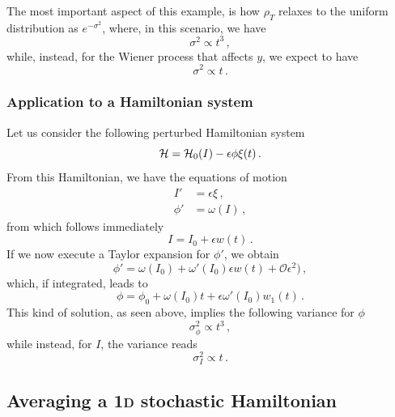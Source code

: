 The most important aspect of this example, is how \(\rho_T\) relaxes to the uniform distribution as \(e^{-\sigma^2}\), where, in this scenario, we have
\begin{equation}
	\sigma^2 \propto t^{3} \,,
\end{equation}
while, instead, for the Wiener process that affects \(y\), we expect to have
\begin{equation}
	\sigma^2 \propto t \,.
\end{equation}

\subsubsection*{Application to a Hamiltonian system}

Let us consider the following perturbed Hamiltonian system
\begin{equation}
	\mathcal{H} = \mathcal{H}_0(I) - \epsilon \phi \xi(t)\,.
\end{equation}
From this Hamiltonian, we have the equations of motion
\begin{equation}
	\begin{aligned}
		{I'} &= \epsilon\xi\,, \\
		{\phi'} &= \omega(I)\,,
	\end{aligned}
\end{equation}
from which follows immediately
\begin{equation}
	I = I_0 + \epsilon w(t)\,.
\end{equation}
If we now execute a Taylor expansion for \({\phi'}\), we obtain
\begin{equation}
	{\phi'} = \omega(I_0) + \omega'(I_0)\epsilon w(t) + \mathcal{O}\epsilon^2)\,,
\end{equation}
which, if integrated, leads to
\begin{equation}
	\phi = \phi_0 + \omega(I_0)t + \epsilon \omega'(I_0) w_1(t)\,.
\end{equation}
This kind of solution, as seen above, implies the following variance for $\phi$
\begin{equation}
	\sigma_{\phi}^2 \propto t^3\,,
\end{equation}
while instead, for \(I\), the variance reads
\begin{equation}
	\sigma_{I}^2 \propto t\,.
\end{equation}

\subsection{Averaging a 1\textsc{d} stochastic Hamiltonian}
\label{ssc:averaging-1D}


